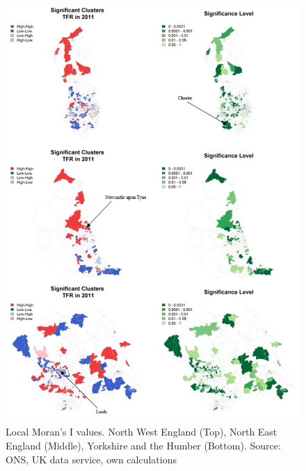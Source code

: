 \documentclass[12pt,twoside]{reedthesis}
\begin{document}
\begin{figure}
\includegraphics[width=0.95\linewidth]{figure/Figure_10} \caption{Local Moran's I values. North West England (Top), North East England (Middle), Yorkshire and the Humber (Bottom). Source: ONS, UK data service, own calculations}\label{fig:figure10}
\end{figure}
\end{document}
